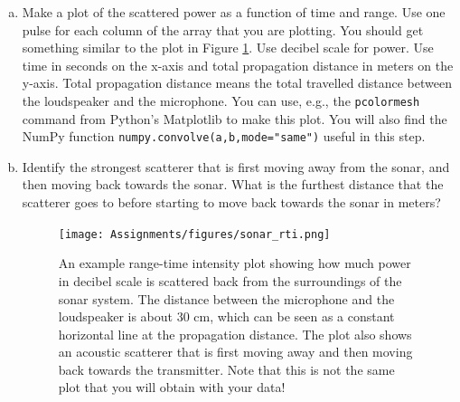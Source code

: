\begin{enumerate}[a)]
  
\item Make a plot of the scattered power as a function of time and
  range. Use one pulse for each column of the array that you are
  plotting.  You should get something similar to the plot in Figure
  \ref{fig:ex_rti_plot}. Use decibel scale for power. Use time in
  seconds on the x-axis and total propagation distance in meters on
  the y-axis. Total propagation distance means the total travelled
  distance between the loudspeaker and the microphone. You can use,
  e.g., the \verb|pcolormesh| command from Python's Matplotlib to
  make this plot. You will also find the NumPy function
  \verb|numpy.convolve(a,b,mode="same")| useful in this step.

\item Identify the strongest scatterer that is first moving away from
  the sonar, and then moving back towards the sonar. What is the
  furthest distance that the scatterer goes to before starting to move
  back towards the sonar in meters?
  
  \begin{figure}
  \begin{center}
    \texttt{[image: Assignments/figures/sonar\_rti.png]}
  \end{center}
  \caption{An example range-time intensity plot showing how much power
    in decibel scale is scattered back from the surroundings of the
    sonar system. The distance between the microphone and the
    loudspeaker is about 30 cm, which can be seen as a constant
    horizontal line at the propagation distance. The plot also shows
    an acoustic scatterer that is first moving away and then moving
    back towards the transmitter. Note that this is not the same plot
    that you will obtain with your data!}
  \label{fig:ex_rti_plot}
\end{figure}

\end{enumerate}
